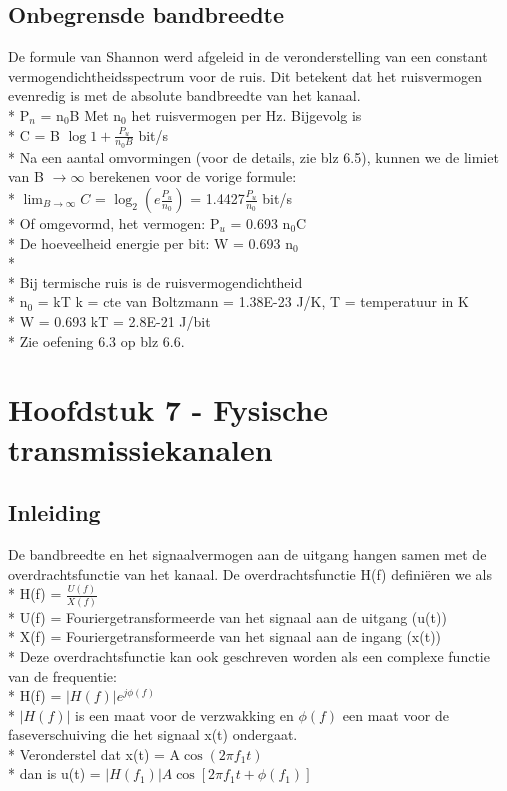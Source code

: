 \documentclass[10pt]{article}
\begin{document}
\subsection{Onbegrensde bandbreedte}
De formule van Shannon werd afgeleid in de veronderstelling van een constant vermogendichtheidsspectrum voor de ruis. Dit betekent dat het ruisvermogen evenredig is met de absolute bandbreedte van het kanaal.\\*
P$_n$ = n$_0$B {\scriptsize Met n$_0$ het ruisvermogen per Hz.} Bijgevolg is\\*
C = B $\log{1 + \frac{P_u}{n_0B}}$ bit/s\\*
Na een aantal omvormingen (voor de details, zie blz 6.5), kunnen we de limiet van B $\rightarrow \infty$ berekenen voor de vorige formule:\\*
$\lim_{B \rightarrow \infty} C$ = $\log_2{(e\frac{P_u}{n_0})}$ = 1.4427$\frac{P_u}{n_0}$ bit/s\\*
Of omgevormd, het vermogen: P$_u$ = 0.693 n$_0$C\\*
De hoeveelheid energie per bit: W = 0.693 n$_0$\\*\\*
Bij termische ruis is de ruisvermogendichtheid\\*
n$_0$ = kT {\scriptsize k = cte van Boltzmann = 1.38E-23 J/K, T = temperatuur in K}\\*
W = 0.693 kT = 2.8E-21 J/bit\\*
{\scriptsize Zie oefening 6.3 op blz 6.6.}
\section{Hoofdstuk 7 - Fysische transmissiekanalen}
\subsection{Inleiding}
De bandbreedte en het signaalvermogen aan de uitgang hangen samen met de overdrachtsfunctie van het kanaal. De overdrachtsfunctie H(f) defini\"eren we als\\*
H(f) = $\frac{U(f)}{X(f)}$\\*
U(f) = Fouriergetransformeerde van het signaal aan de uitgang (u(t))\\*
X(f) = Fouriergetransformeerde  van het signaal aan de ingang (x(t))\\*
Deze overdrachtsfunctie kan ook geschreven worden als een complexe functie van de frequentie:\\*
H(f) = $|H(f)|e^{j\phi(f)}$\\*
$|H(f)|$ is een maat voor de verzwakking en $\phi(f)$ een maat voor de faseverschuiving die het signaal x(t) ondergaat.\\*
Veronderstel dat x(t) = A$\cos{(2\pi f_1t)}$\\*
dan is u(t) = $|H(f_1)|A\cos{\left[2\pi f_1t+\phi(f_1)\right]}$
\end{document}
